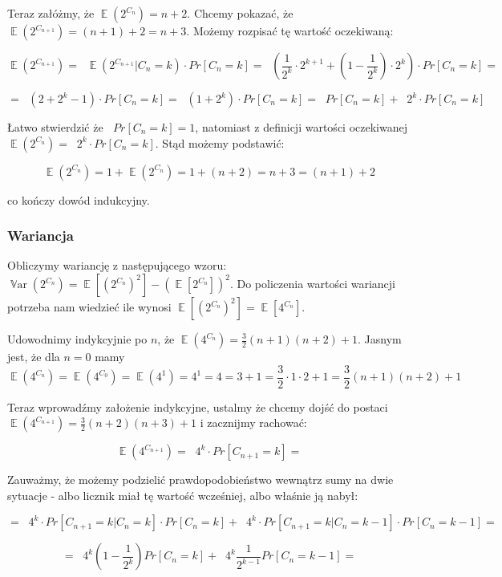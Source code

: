 \documentclass{article}
\DeclareMathOperator{\EX}{\mathbb{E}}%
\DeclareMathOperator{\Var}{\mathbb{V}ar}%
\DeclareMathOperator{\sumk}{\sum_{k \ge 0}}
\begin{document}
    Teraz załóżmy, że $\EX(2^{C_n}) = n + 2$. Chcemy pokazać, że $\EX(2^{C_{n+1}}) = (n + 1) + 2 = n + 3$.
    Możemy rozpisać tę wartość oczekiwaną:

    \begin{equation}
    \EX(2^{C_{n+1}}) = \sumk \EX(2^{C_{n+1}} | C_n = k) \cdot Pr[C_n = k] = \sumk (\frac{1}{2^k} \cdot 2^{k+1} + (1 - \frac{1}{2^k}) \cdot 2^k) \cdot Pr[C_n = k] =
    \end{equation}

    \begin{equation}
    = \sumk (2 + 2^k - 1) \cdot Pr[C_n = k] = \sumk (1 + 2^k) \cdot Pr[C_n = k] = \sumk Pr[C_n = k] + \sumk 2^k \cdot Pr[C_n = k]
    \end{equation}

    Łatwo stwierdzić że $\sumk Pr[C_n = k] = 1$, natomiast z definicji wartości oczekiwanej $\EX(2^{C_n}) = \sumk 2^k \cdot Pr[C_n = k]$. Stąd możemy podstawić:

    \[ \EX(2^{C_n}) = 1 + \EX(2^{C_n}) = 1 + (n + 2) = n + 3 = (n + 1) + 2 \]

    co kończy dowód indukcyjny.
    \subsubsection{Wariancja}
    Obliczymy wariancję z następującego wzoru: $\Var(2^{C_n}) = \EX[(2^{C_n})^2] - (\EX[2^{C_n}])^2$. Do policzenia wartości wariancji potrzeba nam wiedzieć ile wynosi $\EX[(2^{C_n})^2] = \EX[4^{C_n}]$.

    Udowodnimy indykcyjnie po $n$, że $\EX(4^{C_n}) = \frac{3}{2}(n+1)(n+2) + 1$. Jasnym jest, że dla $n = 0$ mamy 
    \[ \EX(4^{C_n}) = \EX(4^{C_0}) = \EX(4^1) = 4^1 = 4 = 3 + 1 = \frac{3}{2} \cdot 1 \cdot 2 + 1 = \frac{3}{2}(n+1)(n+2) + 1 \]

    Teraz wprowadźmy założenie indykcyjne, ustalmy że chcemy dojść do postaci $\EX(4^{C_{n+1}}) = \frac{3}{2}(n+2)(n+3) + 1$ i zacznijmy rachować:

    \[ \EX(4^{C_{n+1}}) = \sumk 4^k \cdot Pr[C_{n+1}=k] = \]

    Zauważmy, że możemy podzielić prawdopodobieństwo wewnątrz sumy na dwie sytuacje - albo licznik miał tę wartość wcześniej, albo właśnie ją nabył:
    
    \[ = \sumk 4^k \cdot Pr[C_{n+1}=k | C_n=k] \cdot Pr[C_n=k] + \sumk 4^k \cdot Pr[C_{n+1}=k | C_n=k-1] \cdot Pr[C_n=k-1] = \]

    \[ = \sumk 4^k (1 - \frac{1}{2^k}) Pr[C_n=k] + \sumk 4^k \frac{1}{2^{k-1}} Pr[C_n=k-1] = \]
    
\end{document}
